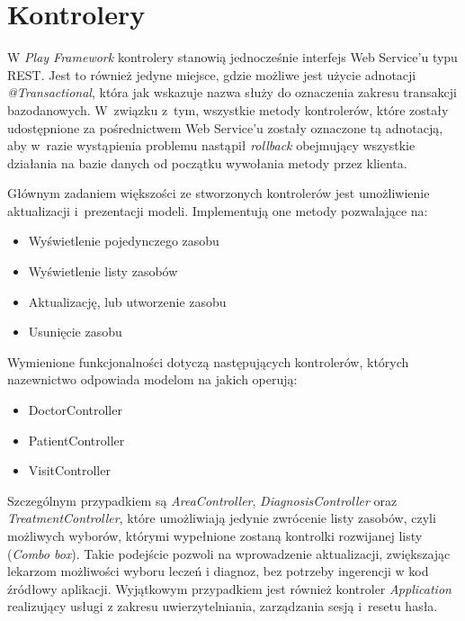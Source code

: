 \documentclass[11pt]{aghdpl}
\begin{document}
\subsubsection{}
\subsubsection{}
\subsubsection{}


\section{Kontrolery}

W \emph{Play Framework} kontrolery stanowią jednocześnie interfejs Web Service'u typu REST. Jest to również jedyne miejsce, gdzie możliwe jest użycie adnotacji \emph{@Transactional}, która jak wskazuje nazwa służy do oznaczenia zakresu transakcji bazodanowych. W~związku z~tym, wszystkie metody kontrolerów, które zostały udostępnione za pośrednictwem Web Service'u zostały oznaczone tą adnotacją, aby w~razie wystąpienia problemu nastąpił \emph{rollback} obejmujący wszystkie działania na bazie danych od początku wywołania metody przez klienta.

Głównym zadaniem większości ze stworzonych kontrolerów jest umożliwienie aktualizacji i~prezentacji modeli. Implementują one metody pozwalające na:

\begin{itemize}
	\item Wyświetlenie pojedynczego zasobu
	\item Wyświetlenie listy zasobów
	\item Aktualizację, lub utworzenie zasobu
	\item Usunięcie zasobu
\end{itemize}

Wymienione funkcjonalności dotyczą następujących kontrolerów, których nazewnictwo odpowiada modelom na jakich operują:

\begin{itemize}
	\item DoctorController
	\item PatientController
	\item VisitController
\end{itemize}

Szczególnym przypadkiem są \emph{AreaController}, \emph{DiagnosisController} oraz \emph{TreatmentController}, które umożliwiają jedynie zwrócenie listy zasobów, czyli możliwych wyborów, którymi wypełnione zostaną kontrolki rozwijanej listy (\emph{Combo box}). Takie podejście pozwoli na wprowadzenie aktualizacji, zwiększając lekarzom możliwości wyboru leczeń i diagnoz, bez potrzeby ingerencji w kod źródłowy aplikacji. Wyjątkowym przypadkiem jest również kontroler \emph{Application} realizujący usługi z zakresu uwierzytelniania, zarządzania sesją i~resetu hasła.
\end{document}
